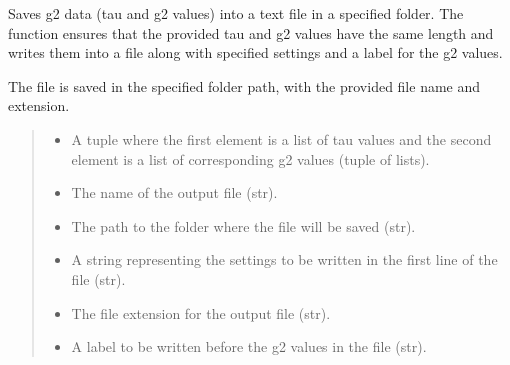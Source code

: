 \documentclass[letterpaper,10pt,english]{sphinxmanual}
\begin{document}
\begin{fulllineitems}
\begin{fulllineitems}
\label{\detokenize{createsavefile:createsavefile.createsavefile.save_g2_data}}
\pysigstartsignatures
{}
\pysigstopsignatures
\sphinxAtStartPar
Saves g2 data (tau and g2 values) into a text file in a specified folder. The function
ensures that the provided tau and g2 values have the same length and writes them into 
a file along with specified settings and a label for the g2 values.

\sphinxAtStartPar
The file is saved in the specified folder path, with the provided file name and extension.
\begin{quote}\begin{description}
\begin{itemize}
\item {} 
\sphinxAtStartPar
{} \textendash{} A tuple where the first element is a list of tau values and the second 
element is a list of corresponding g2 values (tuple of lists).

\item {} 
\sphinxAtStartPar
{} \textendash{} The name of the output file (str).

\item {} 
\sphinxAtStartPar
{} \textendash{} The path to the folder where the file will be saved (str).

\item {} 
\sphinxAtStartPar
{} \textendash{} A string representing the settings to be written in the first line of the file (str).

\item {} 
\sphinxAtStartPar
{} \textendash{} The file extension for the output file (str).

\item {} 
\sphinxAtStartPar
{} \textendash{} A label to be written before the g2 values in the file (str).


\end{itemize}
\end{description}
\end{quote}
\end{fulllineitems}
\end{fulllineitems}
\end{document}
